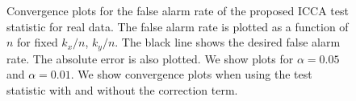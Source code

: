 \begin{figure}
\begin{center}
  \caption{Convergence plots for the false alarm rate of the proposed ICCA test statistic for
    real data. The false alarm rate is plotted as a function of $n$ for fixed $k_x/n$,
    $k_y/n$. The black line shows the desired false alarm rate. The absolute error is also
    plotted. We show plots for $\alpha=0.05$ and $\alpha=0.01$. We show convergence plots
    when using the test statistic with and without the correction term.}
  \label{fig:icca_conv_real}
\end{center}
\end{figure}
